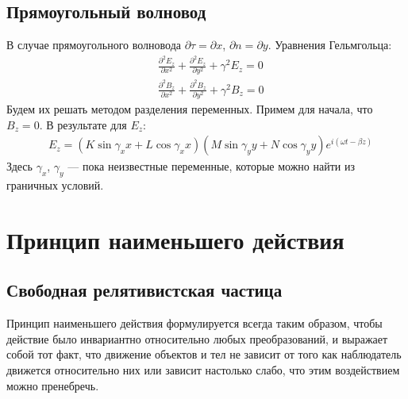 \documentclass[a4paper,14pt]{extreport} %
\newcommand{\dfs}[2]{\frac{\partial^2 #1}{\partial #2^2}}
\begin{document}
	\section{Прямоугольный волновод}
	
	В случае прямоугольного волновода $\partial \tau = \partial x$, $\partial n = \partial y$. Уравнения Гельмгольца:
	\begin{align*}
		& \dfs{E_z}{x} + \dfs{E_z}{y} + \gamma^2 E_z = 0 \\
		& \dfs{B_z}{x} + \dfs{B_z}{y} + \gamma^2 B_z = 0
	\end{align*}
	Будем их решать методом разделения переменных. Примем для начала, что $B_z=0$.  В результате для $E_z$:
	\begin{align*}
		& E_z = (K \sin \gamma_x x + L \cos \gamma_x x) (M \sin \gamma_y y + N \cos \gamma_y y) e^{i (\omega t - \beta z)}
	\end{align*}
	Здесь $\gamma_x$, $\gamma_y$ --- пока неизвестные переменные, которые можно найти из граничных условий.
	
	\chapter{Принцип наименьшего действия}
		
	\section{Свободная релятивистская частица}
	
	Принцип наименьшего действия формулируется всегда таким образом, чтобы действие было инвариантно относительно любых преобразований, и выражает собой тот факт, что движение объектов и тел не зависит от того как наблюдатель движется относительно них или зависит настолько слабо, что этим воздействием можно пренебречь.
	
\end{document}
